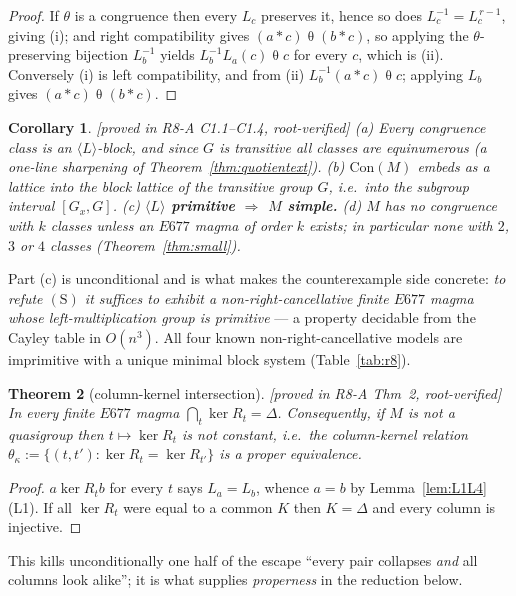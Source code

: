 \documentclass[11pt]{article}
\theoremstyle{plain}
\newtheorem{theorem}{Theorem}[section]
\newtheorem{corollary}[theorem]{Corollary}
\theoremstyle{definition}
\theoremstyle{remark}
\numberwithin{equation}{section}
\newcommand{\op}{\mathbin{*}}
\newcommand{\statusbox}[1]{{\small\sloppy\textsf{[#1]}}}
\newcommand{\PROVED}[1]{\statusbox{proved in #1, root-verified}}
\begin{document}
\begin{proof}
If $\theta$ is a congruence then every $L_c$ preserves it, hence so does
$L_c^{-1} = L_c^{\,r-1}$, giving (i); and right compatibility gives
$(a\op c)\mathrel\theta(b\op c)$, so applying the $\theta$-preserving bijection
$L_b^{-1}$ yields $L_b^{-1}L_a(c)\mathrel\theta c$ for every $c$, which is (ii).
Conversely (i) is left compatibility, and from (ii)
$L_b^{-1}(a\op c)\mathrel\theta c$; applying $L_b$ gives
$(a\op c)\mathrel\theta(b\op c)$.
\end{proof}

\begin{corollary}\label{cor:dictcor}
\PROVED{R8-A C1.1--C1.4}
(a) Every congruence class is an $\langle L\rangle$-block, and since $G$ is
transitive all classes are equinumerous (a one-line sharpening of
Theorem~\ref{thm:quotientext}).
(b) $\mathrm{Con}(M)$ embeds as a lattice into the block lattice of the transitive
group $G$, i.e.\ into the subgroup interval $[G_x,G]$.
(c) \textbf{$\langle L\rangle$ primitive $\Rightarrow$ $M$ simple.}
(d) $M$ has no congruence with $k$ classes unless an $E677$ magma of order $k$
exists; in particular none with $2$, $3$ or $4$ classes
(Theorem~\ref{thm:small}).
\end{corollary}

Part (c) is unconditional and is what makes the counterexample side concrete:
\emph{to refute $(\mathrm{S})$ it suffices to exhibit a non-right-cancellative
finite $E677$ magma whose left-multiplication group is primitive} --- a property
decidable from the Cayley table in $O(n^3)$. All four known non-right-cancellative
models are imprimitive with a unique minimal block system
(Table~\ref{tab:r8}).

\begin{theorem}[column-kernel intersection]\label{thm:colkernel}
\PROVED{R8-A Thm~2}
In every finite $E677$ magma $\bigcap_t\ker R_t = \Delta$. Consequently, if $M$ is
not a quasigroup then $t\mapsto\ker R_t$ is \emph{not} constant, i.e.\ the
column-kernel relation $\theta_\kappa := \{(t,t') : \ker R_t = \ker R_{t'}\}$ is a
proper equivalence.
\end{theorem}

\begin{proof}
$a\mathrel{\ker R_t}b$ for every $t$ says $L_a = L_b$, whence $a = b$ by
Lemma~\ref{lem:L1L4}(L1). If all $\ker R_t$ were equal to a common $K$ then
$K = \Delta$ and every column is injective.
\end{proof}

This kills unconditionally one half of the escape ``every pair collapses
\emph{and} all columns look alike''; it is what supplies \emph{properness} in the
reduction below.
\end{document}
